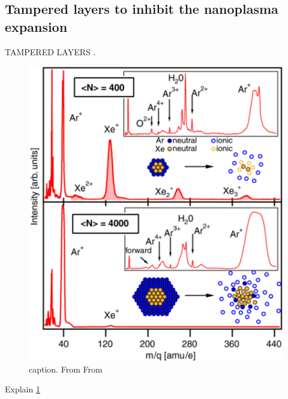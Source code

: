 \subsection{Tampered layers to inhibit the nanoplasma expansion}
%
%
TAMPERED LAYERS \citep{Hoener-2008-JPB}. \citep{Ziemkewitz-2017-unpublished}
\begin{figure}
	\centering
		\includegraphics[width=1.00\textwidth]{images/Hoener-image.jpg}
	\caption{caption. From From \citep[\href{https://creativecommons.org/licenses/by/3.0/}{\ccby}]{Hoener-2008-JPB}}
	\label{fig:Hoener-image}
\end{figure}
Explain \ref{fig:Hoener-image}